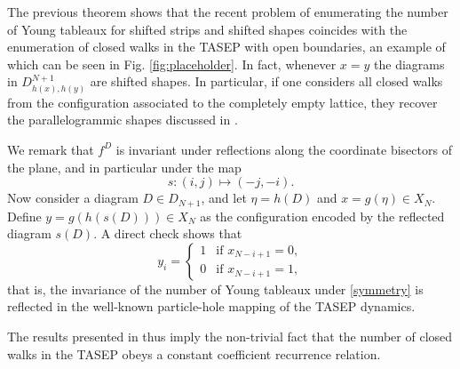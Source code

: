 \documentclass{article}
\begin{document}
The previous theorem shows that the recent problem of enumerating the number of Young tableaux for shifted strips and shifted shapes coincides with the enumeration of closed walks in the TASEP with open boundaries, an example of which can be seen in Fig. \ref{fig:placeholder}. In fact, whenever $x=y$ the diagrams in $D^{N+1}_{h(x),h(y)}$ are shifted shapes. In particular, if one considers all closed walks from the configuration associated to the completely empty lattice, they recover the parallelogrammic shapes discussed in \cite{VeraLopez2017,Sun2015EnumerationOS}.


We remark that $f^D$ is invariant under reflections along the coordinate bisectors of the plane, and in particular under the map
\begin{equation}
    \label{symmetry}
    s\colon  (i,j)\mapsto(-j,-i).
\end{equation}
Now consider a diagram $D\in D_{N+1}$, and let $\eta=h(D)$ and $x=g(\eta)\in X_N$. Define $y=g(h(s(D)))\in X_N$ as the configuration encoded by the reflected diagram $s(D)$. A direct check shows that
\begin{equation*}
    y_i=\begin{cases}
        1 & \text{if } x_{N-i+1}=0,\\
        0 & \text{if } x_{N-i+1}=1,
    \end{cases}
\end{equation*}
that is, the invariance of the number of Young tableaux under \eqref{symmetry} is reflected in the well-known particle-hole mapping of the TASEP dynamics.

The results presented in \cite{periodiPPartitions} thus imply the non-trivial fact that the number of closed walks in the TASEP obeys a constant coefficient recurrence relation.
\end{document}
